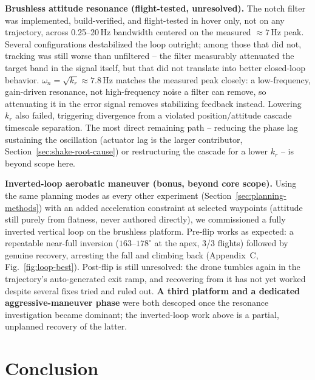 \documentclass[11pt,a4paper]{article}
\begin{document}
\textbf{Brushless attitude resonance (flight-tested, unresolved).} The notch filter was
implemented, build-verified, and flight-tested in hover only, not on any trajectory, across
0.25--20\,Hz bandwidth centered on the measured $\approx7$\,Hz peak. Several configurations
destabilized the loop outright; among those that did not, tracking was still worse than
unfiltered -- the filter measurably attenuated the target band in the signal itself, but that did
not translate into better closed-loop behavior. $\omega_n=\sqrt{k_r}\approx7.8$\,Hz matches the
measured peak closely: a low-frequency, gain-driven resonance, not high-frequency noise a filter
can remove, so attenuating it in the error signal removes stabilizing feedback instead. Lowering
$k_r$ also failed, triggering divergence from a violated position/attitude cascade timescale
separation. The most direct remaining path -- reducing the phase lag sustaining the oscillation
(actuator lag is the larger contributor, Section~\ref{sec:shake-root-cause}) or restructuring the
cascade for a lower $k_r$ -- is beyond scope here.

\textbf{Inverted-loop aerobatic maneuver (bonus, beyond core scope).} Using the same planning
modes as every other experiment (Section~\ref{sec:planning-methods}) with an added acceleration
constraint at selected waypoints (attitude still purely from flatness, never authored directly),
we commissioned a fully inverted vertical loop on the brushless platform. Pre-flip works as
expected: a repeatable near-full inversion ($163$--$178^\circ$
at the apex, 3/3 flights) followed by genuine recovery, arresting the fall and climbing back
(Appendix~C, Fig.~\ref{fig:loop-best}). Post-flip is still unresolved: the drone tumbles again in
the trajectory's auto-generated exit ramp, and recovering from it has not yet worked despite
several fixes tried and ruled out. \textbf{A third platform and a dedicated aggressive-maneuver
phase} were both descoped once the
resonance investigation became dominant; the inverted-loop work above is a partial, unplanned
recovery of the latter.

\section{Conclusion}
\end{document}
